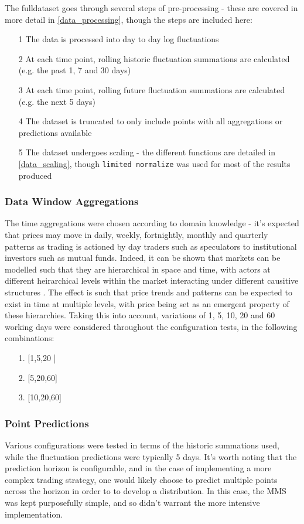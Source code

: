 \documentclass[a4paper,11pt,oneside]{article}
\theoremstyle{plain}
\theoremstyle{definition}
\begin{document}
	The fulldataset goes through several steps of pre-processing - these are covered in more detail in \ref{data_processing}, though the steps are included here:
	
	\begin{itemize}
		\item[1] The data is processed into day to day log fluctuations
		\item[2] At each time point, rolling historic fluctuation summations are calculated (e.g. the past 1, 7 and 30 days)
		\item[3] At each time point, rolling future fluctuation summations are calculated (e.g. the next 5 days)
		\item[4] The dataset is truncated to only include points with all aggregations or predictions available
		\item[5] The dataset undergoes scaling - the different functions are detailed in \ref{data_scaling}, though \texttt{limited normalize} was used for most of the results produced
	\end{itemize}
	
	\subsubsection{Data Window Aggregations} The time aggregations were chosen according to domain knowledge - it's expected that prices may move in daily, weekly, fortnightly, monthly and quarterly patterns as trading is actioned by day traders such as speculators to institutional investors such as mutual funds. Indeed, it can be shown that markets can be modelled such that they are hierarchical in space and time, with actors at different heirarchical levels within the market interacting under different causitive structures \cite{Wilcox}. The effect is such that price trends and patterns can be expected to exist in time at multiple levels, with price being set as an emergent property of these hierarchies. Taking this into account, variations of 1, 5, 10, 20 and 60 working days were considered throughout the configuration tests, in the following combinations:  
	\begin{itemize}
		\item[1.] [1,5,20 ]
		\item[2.] [5,20,60]
		\item[3.] [10,20,60]
	\end{itemize}
	
	\subsubsection {Point Predictions} Various configurations were tested in terms of the historic summations used, while the fluctuation predictions were typically 5 days. It's worth noting that the prediction horizon is configurable, and in the case of implementing a more complex trading strategy, one would likely choose to predict multiple points across the horizon in order to to develop a distribution. In this case, the MMS was kept purposefully simple, and so didn't warrant the more intensive implementation. \newline
	
\end{document}
